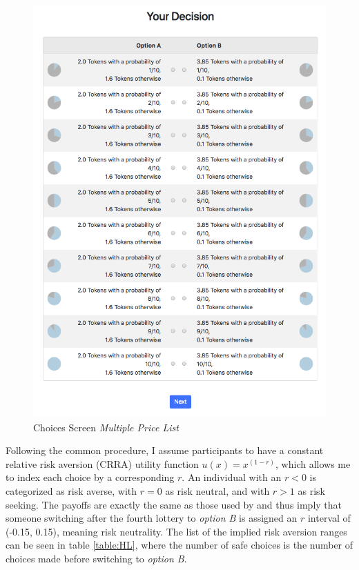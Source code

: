      \begin{figure}
         \centering
         \includegraphics[width=\textwidth]{graphs/Choices_MPL.png}
         \caption{Choices Screen \textit{Multiple Price List}}
         \label{fig:choices_mpl}
     \end{figure}
     
     
    Following the common procedure, I assume participants to have a constant relative risk aversion (CRRA) utility function $u(x)=x^{(1-r)}$, which allows me to index each choice by a corresponding $r$. An individual with an $r<0$ is categorized as risk averse, with $r=0$ as risk neutral, and with $r>1$ as risk seeking. The payoffs are exactly the same as those used by \cite{holt2002} and thus imply that someone switching after the fourth lottery to \textit{option B} is assigned an $r$ interval of (-0.15, 0.15), meaning risk neutrality. The list of the implied risk aversion ranges can be seen in table \ref{table:HL}, where the number of safe choices is the number of choices made before switching to \textit{option B}.
    
